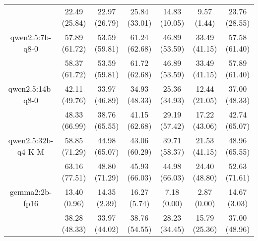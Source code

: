\begin{table}[]
{\begin{tabular}{ccccccc}
        

        \multicolumn{1}{c|}{} & 22.49 (25.84) & 22.97 (26.79) & \multicolumn{1}{c|}{25.84 (33.01)} & 14.83 (10.05) & \multicolumn{1}{c|}{9.57 (1.44)} & 23.76 (28.55) \\
        \cline{1-7}
        

        \multicolumn{1}{c|}{qwen2.5:7b-q8-0} & 57.89 (61.72) & 53.59 (59.81) & \multicolumn{1}{c|}{61.24 (62.68)} & 46.89 (53.59) & \multicolumn{1}{c|}{33.49 (41.15)} & 57.58 (61.40) \\
        
        

        \multicolumn{1}{c|}{} & 58.37 (61.72) & 53.59 (59.81) & \multicolumn{1}{c|}{61.72 (62.68)} & 46.89 (53.59) & \multicolumn{1}{c|}{33.49 (41.15)} & 57.89 (61.40) \\
        \cline{1-7}
        

        \multicolumn{1}{c|}{qwen2.5:14b-q8-0} & 42.11 (49.76) & 33.97 (46.89) & \multicolumn{1}{c|}{34.93 (48.33)} & 25.36 (34.93) & \multicolumn{1}{c|}{12.44 (21.05)} & 37.00 (48.33) \\
        
        

        \multicolumn{1}{c|}{} & 48.33 (66.99) & 38.76 (65.55) & \multicolumn{1}{c|}{41.15 (62.68)} & 29.19 (57.42) & \multicolumn{1}{c|}{17.22 (43.06)} & 42.74 (65.07) \\
        \cline{1-7}
        

        \multicolumn{1}{c|}{qwen2.5:32b-q4-K-M} & 58.85 (71.29) & 44.98 (65.07) & \multicolumn{1}{c|}{43.06 (60.29)} & 39.71 (58.37) & \multicolumn{1}{c|}{21.53 (41.15)} & 48.96 (65.55) \\
        
        

        \multicolumn{1}{c|}{} & 63.16 (77.51) & 48.80 (71.29) & \multicolumn{1}{c|}{45.93 (66.03)} & 44.98 (66.03) & \multicolumn{1}{c|}{24.40 (48.80)} & 52.63 (71.61) \\
        \cline{1-7}
        

        \multicolumn{1}{c|}{gemma2:2b-fp16} & 13.40 (0.96) & 14.35 (2.39) & \multicolumn{1}{c|}{16.27 (5.74)} & 7.18 (0.00) & \multicolumn{1}{c|}{2.87 (0.00)} & 14.67 (3.03) \\
        
        

        \multicolumn{1}{c|}{} & 38.28 (48.33) & 33.97 (44.02) & \multicolumn{1}{c|}{38.76 (54.55)} & 28.23 (34.45) & \multicolumn{1}{c|}{15.79 (25.36)} & 37.00 (48.96) \\
        \cline{1-7}
        


\end{tabular}}
\end{table}
